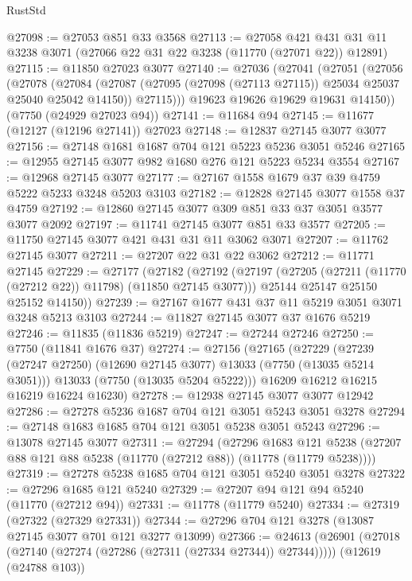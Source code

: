 \begin{lexlean}{RustStd}
\begin{coremodule}
@27098 := @27053 @851 @33 @3568
@27113 := @27058
    @421
    @431
    @31
    @11
    @3238
    @3071
    (@27066 @22 @31 @22 @3238 (@11770 (@27071 @22)) @12891)
@27115 := @11850 @27023 @3077
@27140 := @27036
    (@27041
      (@27051
        (@27056
          (@27078
            (@27084
              (@27087 (@27095 (@27098 (@27113 @27115)) @25034 @25037 @25040 @25042 @14150))
              @27115)))
        @19623
        @19626
        @19629
        @19631
        @14150))
    (@7750 (@24929 @27023 @94))
@27141 := @11684 @94
@27145 := @11677 (@12127 (@12196 @27141)) @27023
@27148 := @12837 @27145 @3077 @3077
@27156 := @27148 @1681 @1687 @704 @121 @5223 @5236 @3051 @5246
@27165 := @12955 @27145 @3077 @982 @1680 @276 @121 @5223 @5234 @3554
@27167 := @12968 @27145 @3077
@27177 := @27167 @1558 @1679 @37 @39 @4759 @5222 @5233 @3248 @5203 @3103
@27182 := @12828 @27145 @3077 @1558 @37 @4759
@27192 := @12860 @27145 @3077 @309 @851 @33 @37 @3051 @3577 @3077 @2092
@27197 := @11741 @27145 @3077 @851 @33 @3577
@27205 := @11750 @27145 @3077 @421 @431 @31 @11 @3062 @3071
@27207 := @11762 @27145 @3077
@27211 := @27207 @22 @31 @22 @3062
@27212 := @11771 @27145
@27229 := @27177
    (@27182
      (@27192
        (@27197 (@27205 (@27211 (@11770 (@27212 @22)) @11798) (@11850 @27145 @3077)))
        @25144
        @25147
        @25150
        @25152
        @14150))
@27239 := @27167 @1677 @431 @37 @11 @5219 @3051 @3071 @3248 @5213 @3103
@27244 := @11827 @27145 @3077 @37 @1676 @5219
@27246 := @11835 (@11836 @5219)
@27247 := @27244 @27246
@27250 := @7750 (@11841 @1676 @37)
@27274 := @27156
    (@27165
      (@27229
        (@27239 (@27247 @27250) (@12690 @27145 @3077) @13033 (@7750 (@13035 @5214 @3051)))
        @13033
        (@7750 (@13035 @5204 @5222)))
      @16209
      @16212
      @16215
      @16219
      @16224
      @16230)
@27278 := @12938 @27145 @3077 @3077 @12942
@27286 := @27278 @5236 @1687 @704 @121 @3051 @5243 @3051 @3278
@27294 := @27148 @1683 @1685 @704 @121 @3051 @5238 @3051 @5243
@27296 := @13078 @27145 @3077
@27311 := @27294
    (@27296
      @1683
      @121
      @5238
      (@27207 @88 @121 @88 @5238 (@11770 (@27212 @88)) (@11778 (@11779 @5238))))
@27319 := @27278 @5238 @1685 @704 @121 @3051 @5240 @3051 @3278
@27322 := @27296 @1685 @121 @5240
@27329 := @27207 @94 @121 @94 @5240 (@11770 (@27212 @94))
@27331 := @11778 (@11779 @5240)
@27334 := @27319 (@27322 (@27329 @27331))
@27344 := @27296 @704 @121 @3278 (@13087 @27145 @3077 @701 @121 @3277 @13099)
@27366 := @24613
    (@26901 (@27018 (@27140 (@27274 (@27286 (@27311 (@27334 @27344)) @27344)))))
    (@12619 (@24788 @103))

\end{coremodule}
\end{lexlean}
